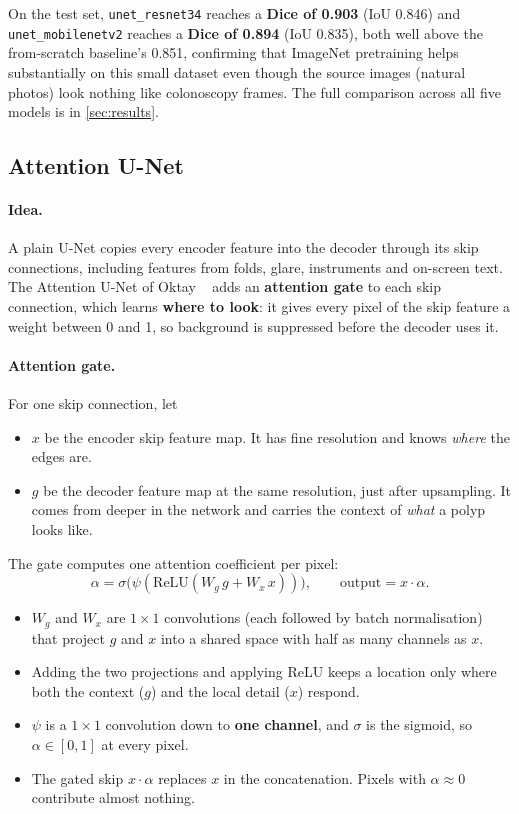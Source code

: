 On the test set, \texttt{unet\_resnet34} reaches a \textbf{Dice of 0.903} (IoU 0.846) and \texttt{unet\_mobilenetv2} reaches a
\textbf{Dice of 0.894} (IoU 0.835), both well above the from-scratch baseline's 0.851, confirming that ImageNet
pretraining helps substantially on this small dataset even though the source images (natural photos) look
nothing like colonoscopy frames. The full comparison across all five models is in \cref{sec:results}.

\subsection{Attention U-Net}
\label{sec:attention}

\paragraph{Idea.}
A plain U-Net copies every encoder feature into the decoder through its skip connections, including
features from folds, glare, instruments and on-screen text. The Attention U-Net of Oktay \etal~\cite{oktay2018attention}
adds an \textbf{attention gate} to each skip connection, which learns \textbf{where to look}: it gives every pixel
of the skip feature a weight between 0 and 1, so background is suppressed before the decoder uses it.

\paragraph{Attention gate.}
For one skip connection, let
\begin{itemize}
  \item $x$ be the encoder skip feature map. It has fine resolution and knows \emph{where} the edges are.
  \item $g$ be the decoder feature map at the same resolution, just after upsampling. It comes from deeper in
        the network and carries the context of \emph{what} a polyp looks like.
\end{itemize}
The gate computes one attention coefficient per pixel:
\begin{equation}
  \alpha = \sigma\bigl(\psi(\mathrm{ReLU}(W_g\, g + W_x\, x))\bigr), \qquad \text{output} = x \cdot \alpha .
  \label{eq:gate}
\end{equation}
\begin{itemize}
  \item $W_g$ and $W_x$ are $1\times1$ convolutions (each followed by batch normalisation) that project $g$ and $x$
        into a shared space with half as many channels as $x$.
  \item Adding the two projections and applying ReLU keeps a location only where both the context ($g$) and the
        local detail ($x$) respond.
  \item $\psi$ is a $1\times1$ convolution down to \textbf{one channel}, and $\sigma$ is the sigmoid, so $\alpha \in [0, 1]$ at every pixel.
  \item The gated skip $x \cdot \alpha$ replaces $x$ in the concatenation. Pixels with $\alpha \approx 0$ contribute almost nothing.
\end{itemize}

